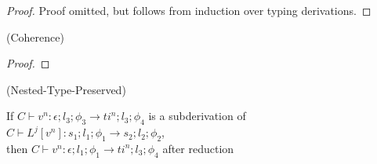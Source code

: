 \begin{proof}
    Proof omitted, but follows from induction over typing derivations.
\end{proof}

\begin{lemma}{(Coherence)}
\end{lemma}
\begin{proof}
\end{proof}

\begin{lemma}{(Nested-Type-Preserved)}

    If $C \vdash v^n : \epsilon;l_3;\phi_3 \rightarrow ti^n;l_3;\phi_4$ is a subderivation of $C \vdash  L^j [v^n] : s_1;l_1;\phi_1 \rightarrow s_2;l_2;\phi_2$,
    \\then $C \vdash v^n : \epsilon;l_1;\phi_1 \rightarrow ti^n;l_3;\phi_4$ after reduction
\end{lemma}
